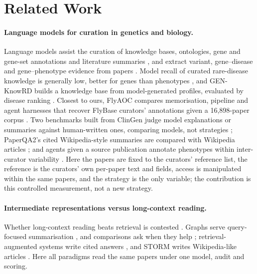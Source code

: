 \documentclass{article} %
\begin{document}
\section{Related Work}
\label{sec:related_work}
\paragraph{Language models for curation in genetics and biology.}
Language models assist the curation of knowledge bases, ontologies, gene and gene-set annotations and literature summaries \citep{caufield2024structured,caufield2024curategpt,toro2024dynamic,Li2025GenewhispererEnhancing,hu2025evaluation,niyonkuru2025leveraging,Green2026GoflowllmcuratingMirna,Murphy2024HarnessingGenerative,Green2023LitsummLarge}, and extract variant, gene--disease and gene--phenotype evidence from papers \citep{li2025autopm3,furlan2025eagleai,wang2026pubmind,yin2026benchmarking,twede2026evidence}. Model recall of curated rare-disease knowledge is generally low, better for genes than phenotypes \citep{groza2026systematic}, and GEN-KnowRD builds a knowledge base from model-generated profiles, evaluated by disease ranking \citep{yan2026genknowrd}. Closest to ours, FlyAOC compares memorisation, pipeline and agent harnesses that recover FlyBase curators' annotations given a 16,898-paper corpus \citep{zhang2026flyaoc}. Two benchmarks built from ClinGen judge model explanations or summaries against human-written ones, comparing models, not strategies \citep{queen2025cgbench,Saadat2026LargeLanguage}; PaperQA2's cited Wikipedia-style summaries are compared with Wikipedia articles \citep{skarlinski2024language}; and agents given a source publication annotate phenotypes within inter-curator variability \citep{balhoff2026frontier}. Here the papers are fixed to the curators' reference list, the reference is the curators' own per-paper text and fields, access is manipulated within the same papers, and the strategy is the only variable; the contribution is this controlled measurement, not a new strategy.

\paragraph{Intermediate representations versus long-context reading.}
Whether long-context reading beats retrieval is contested \citep{Li2024LongContext,Yu2024DefenseRag,liu2024lost,Zhang2024ChainAgents,Li2025LaraBenchmarking}. Graphs serve query-focused summarisation \citep{edge2024local}, and comparisons ask when they help \citep{han2025rag,xiang2025use}; retrieval-augmented systems write cited answers \citep{Lla2023PaperqaRetrievalaugmented,Asai2024OpenscholarSynthesizing,singh2025ai2}, and STORM writes Wikipedia-like articles \citep{shao2024assisting}. Here all paradigms read the same papers under one model, audit and scoring.
\end{document}
